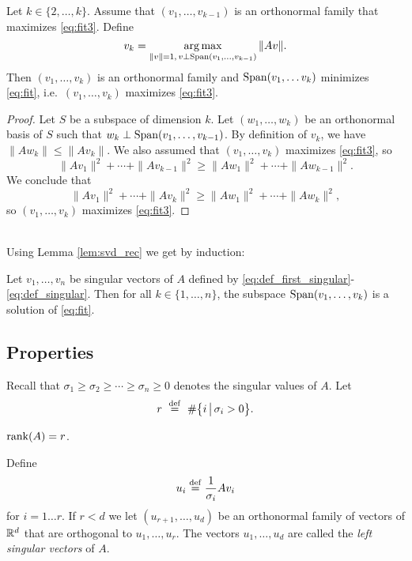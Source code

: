 \documentclass[11pt,nocut]{article}
\begin{document}
\begin{lemma}\label{lem:svd_rec}
	Let $k \in \{2, \dots, k\}$. Assume that $(v_1, \dots, v_{k-1})$ is an orthonormal family that maximizes \eqref{eq:fit3}.
	Define 
	$$
	v_k = \operatorname*{arg\,max}_{\|v\| = 1, \, v \perp {{\rm Span}}(v_1, \dots, v_{k-1})} \|Av\|.
	$$
	Then $(v_1, \dots, v_{k})$ is an orthonormal family and ${{\rm Span}}(v_1, \dots v_k)$ minimizes \eqref{eq:fit}, i.e.\ $(v_1, \dots, v_{k})$ maximizes \eqref{eq:fit3}.
\end{lemma}
\begin{proof}
	Let $S$ be a subspace of dimension $k$. Let $(w_1, \dots, w_k)$ be an orthonormal basis of $S$ such that $w_{k} \perp {{\rm Span}}(v_1, \dots, v_{k-1})$. By definition of $v_k$,
	we have $\|A w_k \| \leq \| A v_k\|$. 
	We also assumed that $(v_1, \dots, v_k)$ maximizes \eqref{eq:fit3}, so
	$$
	\|A v_1\|^2 + \cdots + \| A v_{k-1} \|^2 \geq
	\|A w_1\|^2 + \cdots+ \| A w_{k-1} \|^2.
	$$
	We conclude that
	$$
	\|A v_1\|^2 + \cdots + \| A v_{k} \|^2 \geq
	\|A w_1\|^2 + \cdots + \| A w_{k} \|^2,
	$$
	so $(v_1, \dots, v_k)$ maximizes \eqref{eq:fit3}.
\end{proof}
\\

Using Lemma \ref{lem:svd_rec} we get by induction:
\begin{proposition}
	Let $v_1, \dots, v_n$ be singular vectors of $A$ defined by \eqref{eq:def_first_singular}-\eqref{eq:def_singular}. Then for all $k \in \{1, \dots, n\}$, the subspace ${{\rm Span}}(v_1, \dots, v_k)$ is a solution of \eqref{eq:fit}.
\end{proposition}


\subsection{Properties}

Recall that $\sigma_1 \geq \sigma_2 \geq \cdots \geq \sigma_n \geq 0$ denotes the singular values of $A$. Let
$$
r \ \overset{\rm def}{=} \
\# \big\{ i \, \big| \, \sigma_i > 0\big\}.
$$

\begin{proposition}
	${{\rm rank}}(A) = r$.
\end{proposition}

\begin{definition}
	Define
	$$
	u_i \overset{\rm def}{=} \frac{1}{\sigma_i} A v_i
	$$
	for $i = 1 \dots r$. If $r<d$ we let $(u_{r+1}, \dots, u_d)$ be an orthonormal family of vectors of $\mathbb{R}^d$ that are orthogonal to $u_1, \dots, u_r$.
	The vectors $u_1, \dots, u_d$ are called the \emph{left singular vectors} of $A$.
\end{definition}
\end{document}
